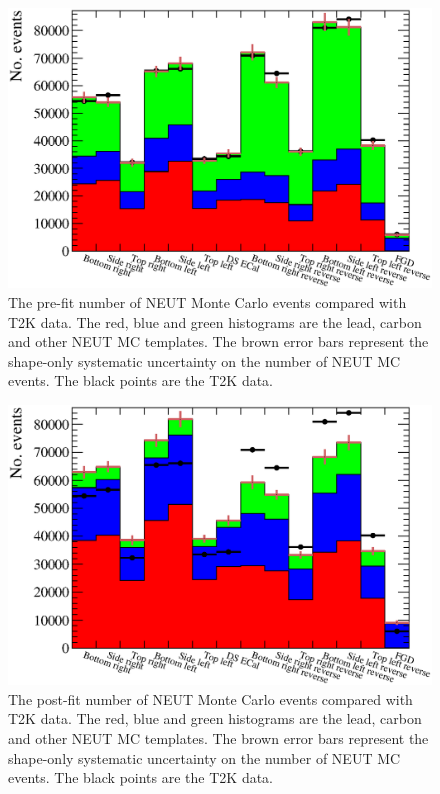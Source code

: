 \begin{figure}[b!]
  \centering
  \includegraphics[width=15cm]{images/measurement/data/MCTemplatesWithSystematics_T2KData_PreFit.eps}
  \caption{The pre-fit number of NEUT Monte Carlo events compared with T2K data.  The red, blue and green histograms are the lead, carbon and other NEUT MC templates.  The brown error bars represent the shape-only systematic uncertainty on the number of NEUT MC events.  The black points are the T2K data.}
  \label{fig:MCTemplatesWithSystematicsT2KDataPreFit}
\end{figure}
\begin{figure}
  \centering
  \includegraphics[width=15cm]{images/measurement/data/MCTemplatesWithSystematics_T2KData_PostFit.eps}
  \caption{The post-fit number of NEUT Monte Carlo events compared with T2K data.  The red, blue and green histograms are the lead, carbon and other NEUT MC templates.  The brown error bars represent the shape-only systematic uncertainty on the number of NEUT MC events.  The black points are the T2K data.}
  \label{fig:MCTemplatesWithSystematicsT2KDataPostFit}
\end{figure}
